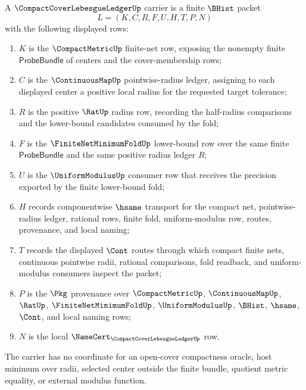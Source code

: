 \begin{definition}
\label{def:compact-cover-lebesgue-ledger-carrier}
A $\CompactCoverLebesgueLedgerUp$ carrier is a finite $\BHist$ packet
$$
L=(K,C,R,F,U,H,T,P,N)
$$
with the following displayed rows:
\begin{enumerate}
\item $K$ is the $\CompactMetricUp$ finite-net row, exposing the nonempty finite $\mathsf{ProbeBundle}$ of centers and the cover-membership rows;
\item $C$ is the $\ContinuousMapUp$ pointwise-radius ledger, assigning to each displayed center a positive local radius for the requested target tolerance;
\item $R$ is the positive $\RatUp$ radius row, recording the half-radius comparisons and the lower-bound candidates consumed by the fold;
\item $F$ is the $\FiniteNetMinimumFoldUp$ lower-bound row over the same finite $\mathsf{ProbeBundle}$ and the same positive radius ledger $R$;
\item $U$ is the $\UniformModulusUp$ consumer row that receives the precision exported by the finite lower-bound fold;
\item $H$ records componentwise $\hsame$ transport for the compact net, pointwise-radius ledger, rational rows, finite fold, uniform-modulus row, routes, provenance, and local naming;
\item $T$ records the displayed $\Cont$ routes through which compact finite nets, continuous pointwise radii, rational comparisons, fold readback, and uniform-modulus consumers inspect the packet;
\item $P$ is the $\Pkg$ provenance over $\CompactMetricUp$, $\ContinuousMapUp$, $\RatUp$, $\FiniteNetMinimumFoldUp$, $\UniformModulusUp$, $\BHist$, $\hsame$, $\Cont$, and local naming rows;
\item $N$ is the local $\NameCert_{\CompactCoverLebesgueLedgerUp}$ row.
\end{enumerate}
The carrier has no coordinate for an open-cover compactness oracle, host minimum over radii, selected center outside the finite bundle, quotient metric equality, or external modulus function.
\end{definition}

